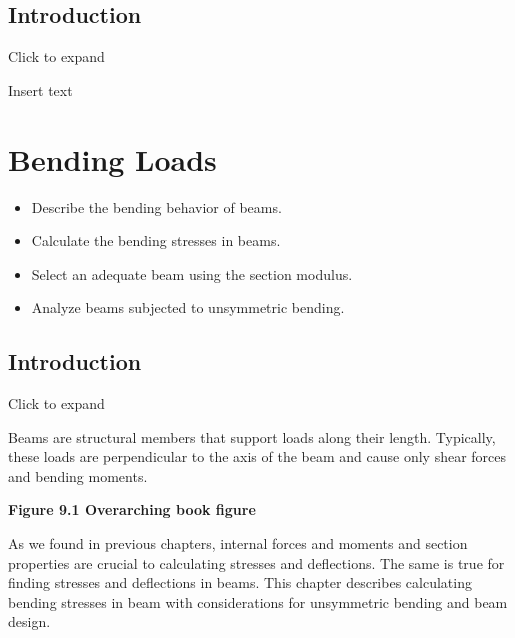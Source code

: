 \documentclass[
  letterpaper,
  DIV=11,
  numbers=noendperiod]{scrreprt}
\providecommand{\tightlist}{%
  \setlength{\itemsep}{0pt}\setlength{\parskip}{0pt}}\usepackage{longtable,booktabs,array}
\begin{document}
\section{Introduction}\label{introduction-8}

Click to expand

Insert text


\chapter{Bending Loads}\label{sec-bending-loads}

\begin{tcolorbox}[enhanced jigsaw, colback=white, colframe=quarto-callout-note-color-frame, leftrule=.75mm, opacitybacktitle=0.6, colbacktitle=quarto-callout-note-color!10!white, arc=.35mm, bottomrule=.15mm, breakable, title={Learning Objectives}, left=2mm, titlerule=0mm, toptitle=1mm, toprule=.15mm, opacityback=0, rightrule=.15mm, coltitle=black, bottomtitle=1mm]

\begin{itemize}
\tightlist
\item
  Describe the bending behavior of beams.
\item
  Calculate the bending stresses in beams.
\item
  Select an adequate beam using the section modulus.
\item
  Analyze beams subjected to unsymmetric bending.
\end{itemize}

\end{tcolorbox}

\section*{Introduction}\label{introduction-9}


Click to expand

Beams are structural members that support loads along their length.
Typically, these loads are perpendicular to the axis of the beam and
cause only shear forces and bending moments.

\textbf{Figure 9.1 Overarching book figure} \,

As we found in previous chapters, internal forces and moments and
section properties are crucial to calculating stresses and deflections.
The same is true for finding stresses and deflections in beams. This
chapter describes calculating bending stresses in beam with
considerations for unsymmetric bending and beam design.
\end{document}
